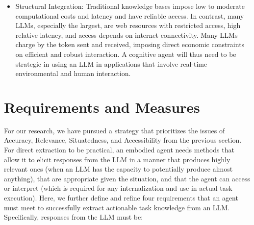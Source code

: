 \documentclass[letterpaper]{article} %
\begin{document}
\begin{itemize}
    \item Structural Integration: Traditional knowledge bases impose low to moderate computational costs and latency and have reliable access. In contrast, many LLMs, especially the largest, are web resources with restricted access, high relative latency, and  access depends on internet connectivity. Many LLMs charge by the token sent and received, imposing direct economic constraints on efficient and robust interaction.
    A cognitive agent will thus need to be strategic in using an LLM in applications that involve real-time environmental and human interaction.

\end{itemize}


\section{Requirements and Measures}

For our research, we have pursued a strategy that prioritizes the issues of Accuracy, Relevance, Situatedness, and Accessibility from the previous section. For direct extraction to be practical, an embodied agent needs methods that allow it to elicit responses from the LLM in a manner that produces highly relevant ones (when an LLM has the capacity to potentially produce almost anything), that are appropriate given the situation, and that the agent can access or interpret (which is required for any internalization and use in actual task execution). Here, we further define and refine four requirements \cite{kirk_improving_2023} that an agent must meet to successfully extract actionable task knowledge from an LLM. Specifically, responses from the LLM must be:
\end{document}
